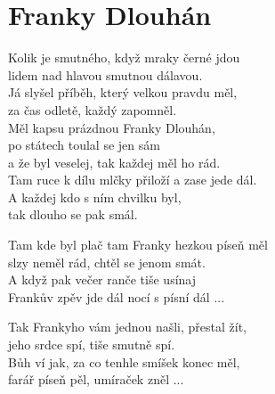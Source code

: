 \section{Franky Dlouhán}
\onehalfspacing

Kolik je smutného, když mraky černé jdou\\
lidem nad hlavou smutnou dálavou.\\
Já slyšel příběh, který velkou pravdu měl,\\
za čas odletě, každý zapomněl.\\

{}Měl kapsu prázdnou Franky Dlouhán,\\
po státech toulal se jen sám \\
a že byl veselej, tak každej měl ho rád.\\
Tam ruce k dílu mlčky přiloží a zase jede dál.\\
A každej kdo s ním chvilku byl,\\
tak dlouho se pak smál.\\



\singlespacing

\sloka{}

Tam kde byl plač tam Franky hezkou píseň měl\\
slzy neměl rád, chtěl se jenom smát.\\
A když pak večer ranče tiše usínaj\\
Frankův zpěv jde dál nocí s písní dál ...\\

\sloka{}

Tak Frankyho vám jednou našli, přestal žít,\\
jeho srdce spí, tiše smutně spí.\\
Bůh ví jak, za co tenhle smíšek konec měl,\\
farář píseň pěl, umíraček zněl ... \\



